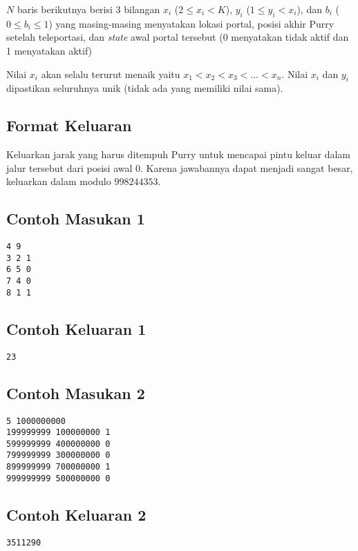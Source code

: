 \documentclass{article}
\begin{document}
$N$ baris berikutnya berisi 3 bilangan $x_i$ ($2 \leq x_i < K$), $y_i$ ($1 \leq y_i < x_i$), dan $b_i$ ($0 \leq b_i \leq 1$) yang masing-masing menyatakan lokasi portal, posisi akhir Purry setelah teleportasi, dan \textit{state} awal portal tersebut (0 menyatakan tidak aktif dan 1 menyatakan aktif)

Nilai $x_i$ akan selalu terurut menaik yaitu $x_1 < x_2 < x_3 < ... < x_n$. Nilai $x_i$ dan $y_i$ dipastikan seluruhnya unik (tidak ada yang memiliki nilai sama).

\subsection*{Format Keluaran}

Keluarkan jarak yang harus ditempuh Purry untuk mencapai pintu keluar dalam jalur tersebut dari posisi awal $0$. Karena jawabannya dapat menjadi sangat besar, keluarkan dalam modulo $998244353$.

\begin{multicols}{2}
\subsection*{Contoh Masukan 1}
\begin{lstlisting}
4 9
3 2 1
6 5 0
7 4 0
8 1 1
\end{lstlisting}
\columnbreak
\subsection*{Contoh Keluaran 1}
\begin{lstlisting}
23
\end{lstlisting}
\vfill
\null
\end{multicols}

\begin{multicols}{2}
\subsection*{Contoh Masukan 2}
\begin{lstlisting}
5 1000000000
199999999 100000000 1
599999999 400000000 0
799999999 300000000 0
899999999 700000000 1
999999999 500000000 0
\end{lstlisting}
\columnbreak
\subsection*{Contoh Keluaran 2}
\begin{lstlisting}
3511290
\end{lstlisting}
\vfill
\null
\end{multicols}
\end{document}
